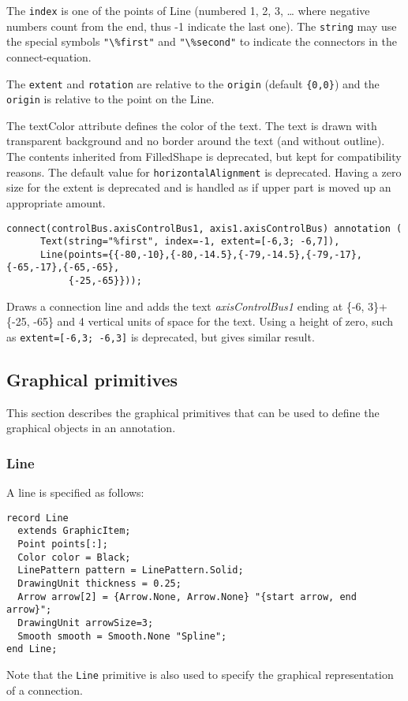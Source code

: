 The \lstinline!index! is one of the points of Line (numbered 1, 2, 3, \ldots{} where
negative numbers count from the end, thus -1 indicate the last one). The \lstinline!string!
may use the special
symbols \lstinline!"\%first"! and \lstinline!"\%second"! to indicate the connectors in the
connect-equation.

The \lstinline!extent! and \lstinline!rotation! are relative to the \lstinline!origin! (default \lstinline!{0,0}!)
and the \lstinline!origin! is relative to the point on the Line.

The textColor attribute defines the color of the text. The text is drawn
with transparent background and no border around the text (and without
outline). The contents inherited from FilledShape is deprecated, but kept for compatibility reasons.
The default value for \lstinline!horizontalAlignment! is deprecated.
Having a zero size for the extent is deprecated and is handled as if upper part is moved up an appropriate amount.

\begin{example}
\begin{lstlisting}[language=modelica]
  connect(controlBus.axisControlBus1, axis1.axisControlBus) annotation (
      Text(string="%first", index=-1, extent=[-6,3; -6,7]),
      Line(points={{-80,-10},{-80,-14.5},{-79,-14.5},{-79,-17},{-65,-17},{-65,-65},
           {-25,-65}}));
\end{lstlisting}
Draws a connection line and adds the text \emph{axisControlBus1}
ending at \{-6, 3\}+\{-25, -65\} and 4 vertical units of space for the text.
Using a height of zero, such as \lstinline!extent=[-6,3; -6,3]! is deprecated, but gives similar result.
\end{example}

\subsection{Graphical primitives}

This section describes the graphical primitives that can be used to
define the graphical objects in an annotation.

\subsubsection{Line}

A line is specified as follows:

\begin{lstlisting}[language=modelica]
record Line
  extends GraphicItem;
  Point points[:];
  Color color = Black;
  LinePattern pattern = LinePattern.Solid;
  DrawingUnit thickness = 0.25;
  Arrow arrow[2] = {Arrow.None, Arrow.None} "{start arrow, end arrow}";
  DrawingUnit arrowSize=3;
  Smooth smooth = Smooth.None "Spline";
end Line;
\end{lstlisting}
Note that the \lstinline!Line! primitive is also used to specify the graphical
representation of a connection.

